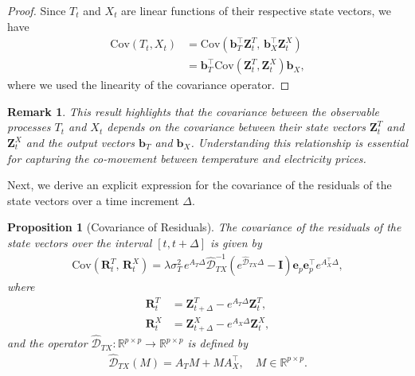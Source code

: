 \documentclass[10pt,a4paper,reqno]{amsart}
\newtheorem{remark}[theorem]{Remark}
\newtheorem{proposition}[theorem]{Proposition}
\theoremstyle{example}
\newcommand{\Cov}{\mathrm{Cov}}
\begin{document}
\begin{proof}
Since $T_t$ and $X_t$ are linear functions of their respective state vectors, we have
\begin{align*}
\Cov(T_t, X_t) &= \Cov\left( \mathbf{b}_T^\top \mathbf{Z}_t^T,\, \mathbf{b}_X^\top \mathbf{Z}_t^X \right) \\
&= \mathbf{b}_T^\top \Cov\left( \mathbf{Z}_t^T, \mathbf{Z}_t^X \right) \mathbf{b}_X,
\end{align*}
where we used the linearity of the covariance operator.
\end{proof}

\begin{remark}
This result highlights that the covariance between the observable processes $T_t$ and $X_t$ depends on the covariance between their state vectors $\mathbf{Z}_t^T$ and $\mathbf{Z}_t^X$ and the output vectors $\mathbf{b}_T$ and $\mathbf{b}_X$. Understanding this relationship is essential for capturing the co-movement between temperature and electricity prices.
\end{remark}

Next, we derive an explicit expression for the covariance of the residuals of the state vectors over a time increment $\Delta$.

\begin{proposition}[Covariance of Residuals]
The covariance of the residuals of the state vectors over the interval $[t, t+\Delta]$ is given by
\begin{align}
\Cov\left( \mathbf{R}_t^T,\, \mathbf{R}_t^X \right) = \lambda \sigma_T^2\, e^{A_T \Delta} \hat{\mathcal{D}}_{TX}^{-1} \left( e^{\hat{\mathcal{D}}_{TX} \Delta} - \mathbf{I} \right) \mathbf{e}_p \mathbf{e}_p^\top e^{A_X^\top \Delta}, \label{eq:cov_residuals}
\end{align}
where
\begin{align}
\mathbf{R}_t^T &= \mathbf{Z}_{t+\Delta}^T - e^{A_T \Delta} \mathbf{Z}_t^T, \\
\mathbf{R}_t^X &= \mathbf{Z}_{t+\Delta}^X - e^{A_X \Delta} \mathbf{Z}_t^X,
\end{align}
and the operator $\hat{\mathcal{D}}_{TX}: \mathbb{R}^{p \times p} \to \mathbb{R}^{p \times p}$ is defined by
\begin{align}
\hat{\mathcal{D}}_{TX}(M) = A_T M + M A_X^\top, \quad M \in \mathbb{R}^{p \times p}. \label{eq:D_TX_operator}
\end{align}
\end{proposition}
\end{document}
